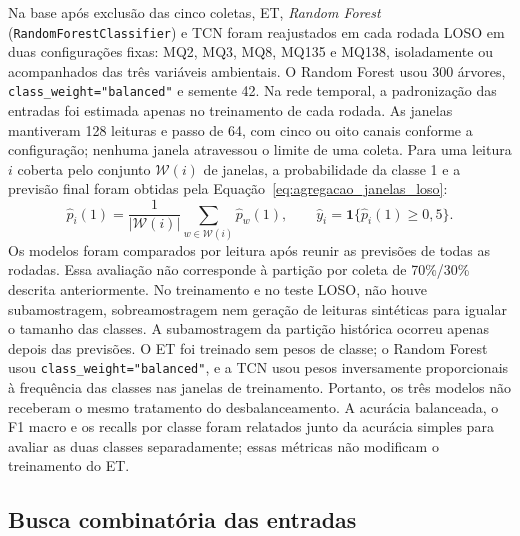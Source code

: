 Na base após exclusão das cinco coletas, ET, \textit{Random Forest}
(\texttt{RandomForestClassifier}) e TCN foram reajustados em cada rodada
LOSO em duas configurações fixas: MQ2, MQ3, MQ8, MQ135 e MQ138, isoladamente ou
acompanhados das três variáveis ambientais. O Random Forest usou 300
árvores, \texttt{class\_weight="balanced"} e semente 42. Na rede temporal,
a padronização das entradas foi estimada apenas no treinamento de cada
rodada. As janelas mantiveram 128 leituras e passo de 64, com cinco ou oito
canais conforme a configuração; nenhuma janela atravessou o limite de
uma coleta. Para uma leitura $i$ coberta pelo conjunto $\mathcal{W}(i)$
de janelas, a probabilidade da classe 1 e a previsão final foram obtidas
pela Equação~\eqref{eq:agregacao_janelas_loso}:
\begin{equation}
    \widehat p_i(1)=
    \frac{1}{|\mathcal{W}(i)|}
    \sum_{w\in\mathcal{W}(i)}\widehat p_w(1),
    \qquad
    \widehat y_i=\mathbf{1}\{\widehat p_i(1)\geq 0{,}5\}.
    \label{eq:agregacao_janelas_loso}
\end{equation}
Os modelos foram comparados por leitura após reunir as previsões de todas
as rodadas. Essa avaliação não corresponde à partição por coleta de 70\%/30\%
descrita anteriormente. No treinamento e no teste LOSO, não houve
subamostragem, sobreamostragem nem geração de leituras sintéticas para
igualar o tamanho das classes. A subamostragem da partição histórica
ocorreu apenas depois das previsões. O ET
foi treinado sem pesos de classe; o Random Forest usou
\texttt{class\_weight="balanced"}, e a TCN usou pesos inversamente
proporcionais à frequência das classes nas janelas de treinamento.
Portanto, os três modelos não receberam o mesmo tratamento do
desbalanceamento. A acurácia balanceada, o F1 macro e os recalls por
classe foram relatados junto da acurácia simples para avaliar as duas
classes separadamente; essas métricas não modificam o treinamento do ET.

\subsection{Busca combinatória das entradas}
\label{subsec:busca_combinatoria_loso}

